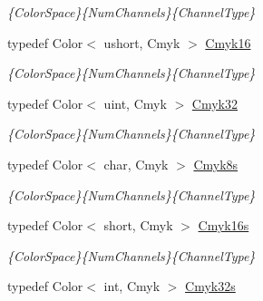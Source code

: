 \begin{DoxyCompactItemize}
\begin{DoxyCompactList}\small\item\em \{Color\-Space\}\{Num\-Channels\}\{Channel\-Type\} \end{DoxyCompactList}\item 
\hypertarget{group___color_types_gad01d72918bc64cb4fb821954ee30b86a}{typedef Color$<$ ushort, Cmyk $>$ \hyperlink{group___color_types_gad01d72918bc64cb4fb821954ee30b86a}{Cmyk16}}\label{group___color_types_gad01d72918bc64cb4fb821954ee30b86a}

\begin{DoxyCompactList}\small\item\em \{Color\-Space\}\{Num\-Channels\}\{Channel\-Type\} \end{DoxyCompactList}\item 
\hypertarget{group___color_types_gac34ec269643083f84e50cb8dedc1dcb9}{typedef Color$<$ uint, Cmyk $>$ \hyperlink{group___color_types_gac34ec269643083f84e50cb8dedc1dcb9}{Cmyk32}}\label{group___color_types_gac34ec269643083f84e50cb8dedc1dcb9}

\begin{DoxyCompactList}\small\item\em \{Color\-Space\}\{Num\-Channels\}\{Channel\-Type\} \end{DoxyCompactList}\item 
\hypertarget{group___color_types_ga5c5b775a544ada02f55ed6dbbc032c09}{typedef Color$<$ char, Cmyk $>$ \hyperlink{group___color_types_ga5c5b775a544ada02f55ed6dbbc032c09}{Cmyk8s}}\label{group___color_types_ga5c5b775a544ada02f55ed6dbbc032c09}

\begin{DoxyCompactList}\small\item\em \{Color\-Space\}\{Num\-Channels\}\{Channel\-Type\} \end{DoxyCompactList}\item 
\hypertarget{group___color_types_ga5cabac67114fed2fb19d5ad7268fc089}{typedef Color$<$ short, Cmyk $>$ \hyperlink{group___color_types_ga5cabac67114fed2fb19d5ad7268fc089}{Cmyk16s}}\label{group___color_types_ga5cabac67114fed2fb19d5ad7268fc089}

\begin{DoxyCompactList}\small\item\em \{Color\-Space\}\{Num\-Channels\}\{Channel\-Type\} \end{DoxyCompactList}\item 
\hypertarget{group___color_types_gae82588af2628e1cc24e31e9d26060461}{typedef Color$<$ int, Cmyk $>$ \hyperlink{group___color_types_gae82588af2628e1cc24e31e9d26060461}{Cmyk32s}}\label{group___color_types_gae82588af2628e1cc24e31e9d26060461}


\end{DoxyCompactItemize}
